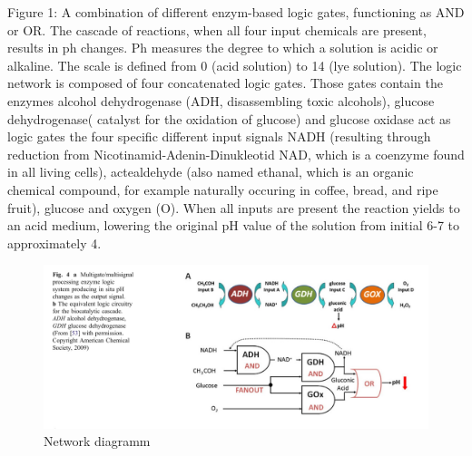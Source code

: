 \documentclass[runningheads]{llncs}
\begin{document}
		Figure 1: A combination of different enzym-based logic gates, functioning as AND or OR. The cascade of reactions, when all four input chemicals are present, results in ph changes. Ph measures the degree to which a solution is acidic or alkaline. The scale is defined from 0 (acid solution) to 14 (lye solution).
		The logic network is composed of four concatenated logic gates. Those gates contain the enzymes alcohol dehydrogenase (ADH, disassembling toxic alcohols), glucose dehydrogenase( catalyst for the oxidation of glucose) and glucose oxidase act as logic gates the four specific different input signals NADH (resulting through reduction from Nicotinamid-Adenin-Dinukleotid NAD, which is a coenzyme found in all living cells),  actealdehyde (also named ethanal, which is an organic chemical compound, for example naturally occuring in coffee, bread, and ripe fruit), glucose and oxygen (O).
	 	When all inputs are present the reaction yields to an acid medium, lowering the original pH value of the solution from initial 6-7 to approximately 4.
		\begin{figure}[H] \centering \includegraphics[scale= 0.3]{pics/biocomputing_sensor.png} \caption{Network diagramm} \label{img:grafik-test} \end{figure}
	
	
\end{document}
